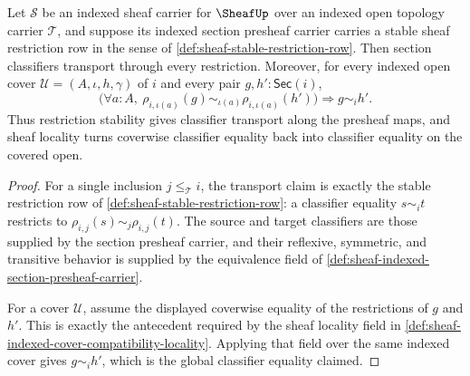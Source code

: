 \begin{theorem}
\label{thm:sheaf-classifier-transport-obligation}
Let $\mathcal{S}$ be an indexed sheaf carrier for $\SheafUp$ over an indexed open topology carrier $\mathcal{T}$, and suppose its indexed section presheaf carrier carries a stable sheaf restriction row in the sense of \autoref{def:sheaf-stable-restriction-row}. Then section classifiers transport through every restriction. Moreover, for every indexed open cover $\mathcal{U}=(A,\iota,h,\gamma)$ of $i$ and every pair $g,h':\mathsf{Sec}(i)$,
$$
\bigl(\forall a:A,\ \rho_{i,\iota(a)}(g)\sim_{\iota(a)}\rho_{i,\iota(a)}(h')\bigr)
\Longrightarrow
g\sim_i h'.
$$
Thus restriction stability gives classifier transport along the presheaf maps, and sheaf locality turns coverwise classifier equality back into classifier equality on the covered open.
\end{theorem}
\begin{proof}
For a single inclusion $j\le_{\mathcal{T}} i$, the transport claim is exactly the stable restriction row of \autoref{def:sheaf-stable-restriction-row}: a classifier equality $s\sim_i t$ restricts to $\rho_{i,j}(s)\sim_j\rho_{i,j}(t)$. The source and target classifiers are those supplied by the section presheaf carrier, and their reflexive, symmetric, and transitive behavior is supplied by the equivalence field of \autoref{def:sheaf-indexed-section-presheaf-carrier}.

For a cover $\mathcal{U}$, assume the displayed coverwise equality of the restrictions of $g$ and $h'$. This is exactly the antecedent required by the sheaf locality field in \autoref{def:sheaf-indexed-cover-compatibility-locality}. Applying that field over the same indexed cover gives $g\sim_i h'$, which is the global classifier equality claimed.
\end{proof}

